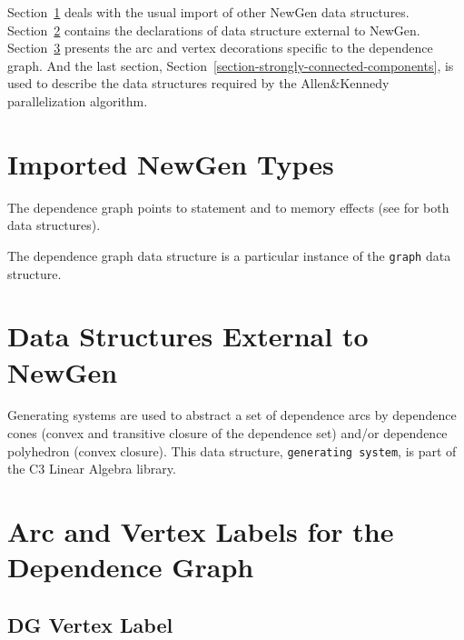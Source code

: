 \documentclass[a4paper]{article}
\begin{document}
Section~\ref{section-imported-newgen-types} deals with the usual import of
other NewGen data structures.
Section~\ref{section-data-structures-external-to-newgen} contains the
declarations of data structure external to NewGen.
Section~\ref{section-arc-and-vertex-lables-for-the-dependence-graph}
presents the arc and vertex decorations specific to the dependence graph.
And the last section, Section~\ref{section-strongly-connected-components},
is used to describe the data structures required by the Allen\&Kennedy
parallelization algorithm.

\section{Imported NewGen Types}
\label{section-imported-newgen-types}

The dependence graph points to statement and to memory effects (see
 for
both data structures).

\begin{comment}
\domain{Import statement from "ri.newgen"}
{}
\end{comment}

{}

The dependence graph data structure is  a particular instance of the
\verb/graph/ data structure.

{}

\section{Data Structures External to NewGen}
\label{section-data-structures-external-to-newgen}

Generating systems are used to abstract a set of dependence arcs by
dependence cones (convex and transitive closure of the dependence set)
and/or dependence polyhedron (convex closure). This data structure,
\verb/generating system/, is
part of the C3 Linear Algebra library.


\section{Arc and Vertex Labels for the Dependence Graph}
\label{section-arc-and-vertex-lables-for-the-dependence-graph}

\subsection{DG Vertex Label}
\end{document}
